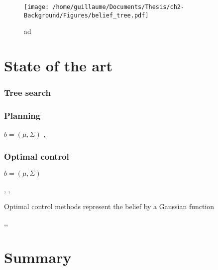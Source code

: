 \begin{figure}[h]
 \centering
 \texttt{[image: /home/guillaume/Documents/Thesis/ch2-Background/Figures/belief\_tree.pdf]}
  \caption{ad}
\end{figure}


\section{State of the art}






%
%
%
%
%

\cite{Sol_POMDP_Policy_space_1998}

\subsubsection{Tree search}

\subsubsection{Planning}
$b = (\mu,\Sigma)$
\cite{Quadrator_2008},\cite{BelRoadMap_2009}


\subsubsection{Optimal control}
$b = (\mu,\Sigma)$
 
\cite{Erez10ascalable},
\cite{mc_update_ppomdps}, 
\cite{Platt-RSS-10}

 

Optimal control methods represent the belief by a Gaussian function 


\cite{Bayesian_explor_exploit_2009},\cite{Spaan05icra},\cite{Thrun_2005}
 

\cite{Rand_belief_space_replanning}
 
 
 \cite{Ross08onlineplanning}
 
 \cite{Macro_uncertainty_2011}

\section{Summary}




